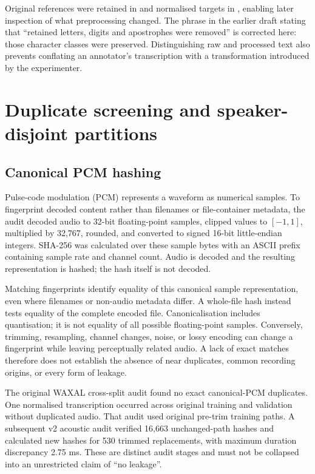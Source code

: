 \documentclass[12pt,a4paper]{report}
\newcommand{\code}[1]{\texttt{\detokenize{#1}}}
\begin{document}
Original references were retained in \code{text_raw} and normalised targets in \code{text}, enabling later inspection of what preprocessing changed. The phrase in the earlier draft stating that ``retained letters, digits and apostrophes were removed'' is corrected here: those character classes were preserved. Distinguishing raw and processed text also prevents conflating an annotator's transcription with a transformation introduced by the experimenter.

\section{Duplicate screening and speaker-disjoint partitions}
\label{sec:splits}

\subsection{Canonical PCM hashing}

Pulse-code modulation (PCM) represents a waveform as numerical samples. To fingerprint decoded content rather than filenames or file-container metadata, the audit decoded audio to 32-bit floating-point samples, clipped values to $[-1,1]$, multiplied by 32,767, rounded, and converted to signed 16-bit little-endian integers. SHA-256 was calculated over these sample bytes with an ASCII prefix containing sample rate and channel count. Audio is decoded and the resulting representation is hashed; the hash itself is not decoded.

Matching fingerprints identify equality of this canonical sample representation, even where filenames or non-audio metadata differ. A whole-file hash instead tests equality of the complete encoded file. Canonicalisation includes quantisation; it is not equality of all possible floating-point samples. Conversely, trimming, resampling, channel changes, noise, or lossy encoding can change a fingerprint while leaving perceptually related audio. A lack of exact matches therefore does not establish the absence of near duplicates, common recording origins, or every form of leakage.

The original WAXAL cross-split audit found no exact canonical-PCM duplicates. One normalised transcription occurred across original training and validation without duplicated audio. That audit used original pre-trim training paths. A subsequent v2 acoustic audit verified 16,663 unchanged-path hashes and calculated new hashes for 530 trimmed replacements, with maximum duration discrepancy 2.75 ms. These are distinct audit stages and must not be collapsed into an unrestricted claim of ``no leakage''.
\end{document}
